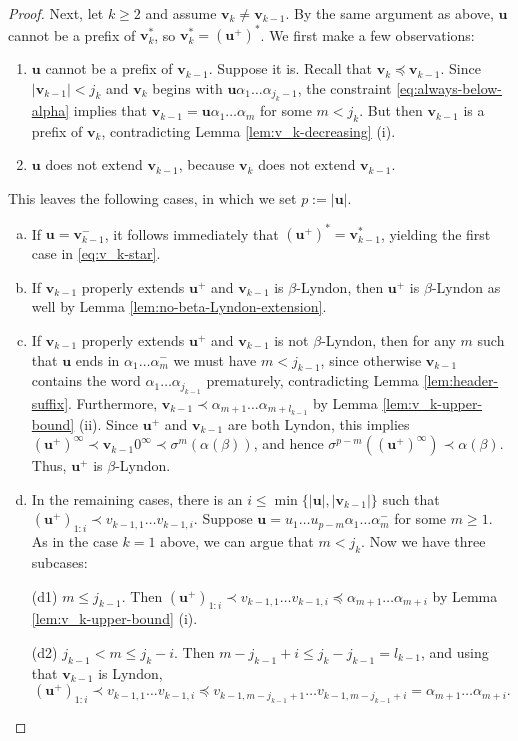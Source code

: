 \documentclass[11pt]{amsart}
\theoremstyle{definition}
\theoremstyle{remark}
\numberwithin{equation}{section}
\renewcommand{\u}{\mathbf{u}}
\renewcommand{\v}{\mathbf{v}}
\newcommand{\f}{\infty}
\newcommand{\al}{\alpha}
\newcommand{\lle}{\preccurlyeq}
\newcommand{\si}{\sigma}
\begin{document}
\begin{proof}
Next, let $k\geq 2$ and assume $\v_k\neq \v_{k-1}$. By the same argument as above, $\u$ cannot be a prefix of $\v_k^*$, so $\v_k^*=(\u^+)^*$. We first make a few observations:
\begin{enumerate}[1.]
\item $\u$ cannot be a prefix of $\v_{k-1}$. Suppose it is. Recall that $\v_k\lle \v_{k-1}$. Since $|\v_{k-1}|<j_k$ and $\v_k$ begins with $\u\al_1\dots\al_{j_k-1}$, the constraint \eqref{eq:always-below-alpha} implies that $\v_{k-1}=\u\al_1\dots\al_m$ for some $m<j_k$. But then $\v_{k-1}$ is a prefix of $\v_k$, contradicting Lemma \ref{lem:v_k-decreasing} (i).
\item $\u$ does not extend $\v_{k-1}$, because $\v_k$ does not extend $\v_{k-1}$.
\end{enumerate}
This leaves the following cases, in which we set $p:=|\u|$.
\begin{enumerate}[(a)]
\item If $\u=\v_{k-1}^-$, it follows immediately that $(\u^+)^*=\v_{k-1}^*$, {yielding the first case in \eqref{eq:v_k-star}.}
\item If $\v_{k-1}$ properly extends $\u^+$ and $\v_{k-1}$ is $\beta$-Lyndon, then $\u^+$ is $\beta$-Lyndon as well by Lemma \ref{lem:no-beta-Lyndon-extension}.
\item If $\v_{k-1}$ properly extends $\u^+$ and $\v_{k-1}$ is not $\beta$-Lyndon, then for any $m$ such that $\u$ ends in $\al_1\dots\al_m^-$ we must have $m<j_{k-1}$, since otherwise $\v_{k-1}$ contains the word $\al_1\dots\al_{j_{k-1}}$ prematurely, contradicting Lemma \ref{lem:header-suffix}. Furthermore, $\v_{k-1}\prec \al_{m+1}\dots\al_{m+l_{k-1}}$ by Lemma \ref{lem:v_k-upper-bound} (ii). Since $\u^+$ and $\v_{k-1}$ are both Lyndon, this implies $(\u^+)^\f\prec \v_{k-1}0^\f\prec\si^m(\al(\beta))$, and hence $\si^{p-m}((\u^+)^\f)\prec\al(\beta)$. Thus, $\u^+$ is $\beta$-Lyndon.
\item {In the remaining cases, there is an $i\leq\min\{|\u|,|\v_{k-1}|\}$ such that $(\u^+)_{1:i}\prec v_{k-1,1}\dots v_{k-1,i}$. Suppose $\u=u_1\dots u_{p-m}\al_1\dots\al_m^-$ for some $m\geq 1$. As in the case $k=1$ above, we can argue that $m<j_k$. Now we have three subcases:

(d1) $m\leq j_{k-1}$. Then $(\u^+)_{1:i}\prec v_{k-1,1}\dots v_{k-1,i}\lle \al_{m+1}\dots\al_{m+i}$ by Lemma \ref{lem:v_k-upper-bound} (i).

(d2) $j_{k-1}<m\leq j_k-i$. Then $m-j_{k-1}+i\leq j_k-j_{k-1}=l_{k-1}$, and using that $\v_{k-1}$ is Lyndon,
\[
(\u^+)_{1:i}\prec v_{k-1,1}\dots v_{k-1,i}\lle v_{k-1,m-j_{k-1}+1}\dots v_{k-1,m-j_{k-1}+i}=\al_{m+1}\dots\al_{m+i}.
\]

}
\end{enumerate}
\end{proof}
\end{document}
